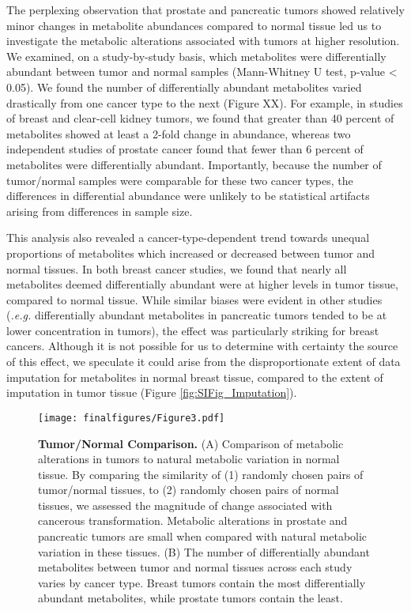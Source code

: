 \documentclass[10pt]{article}
\begin{document}
The perplexing observation that prostate and pancreatic tumors showed relatively minor changes in metabolite abundances compared to normal tissue led us to investigate the metabolic alterations associated with tumors at higher resolution. We examined, on a study-by-study basis, which metabolites were differentially abundant between tumor and normal samples (Mann-Whitney U test, p-value < 0.05). We found the number of differentially abundant metabolites varied drastically from one cancer type to the next (Figure XX). For example, in studies of breast and clear-cell kidney tumors, we found that greater than 40 percent of metabolites showed at least a 2-fold change in abundance, whereas two independent studies of prostate cancer found that fewer than 6 percent of metabolites were differentially abundant. Importantly, because the number of tumor/normal samples were comparable for these two cancer types, the differences in differential abundance were unlikely to be statistical artifacts arising from differences in sample size.

This analysis also revealed a cancer-type-dependent trend towards unequal proportions of metabolites which increased or decreased between tumor and normal tissues. In both breast cancer studies, we found that nearly all metabolites deemed differentially abundant were at higher levels in tumor tissue, compared to normal tissue. While similar biases were evident in other studies (\textit{.e.g.} differentially abundant metabolites in pancreatic tumors tended to be at lower concentration in tumors), the effect was particularly striking for breast cancers. Although it is not possible for us to determine with certainty the source of this effect, we speculate it could arise from the disproportionate extent of data imputation for metabolites in normal breast tissue, compared to the extent of imputation in tumor tissue (Figure \ref{fig:SIFig_Imputation}).

\begin{figure}[ht!]
  \centering
     \texttt{[image: finalfigures/Figure3.pdf]}
  \caption{\textbf{Tumor/Normal Comparison.} (A) Comparison of metabolic alterations in tumors to natural metabolic variation in normal tissue. By comparing the similarity of (1) randomly chosen pairs of tumor/normal tissues, to (2) randomly chosen pairs of normal tissues, we assessed the magnitude of change associated with cancerous transformation. Metabolic alterations in prostate and pancreatic tumors are small when compared with natural metabolic variation in these tissues. (B) The number of differentially abundant metabolites between tumor and normal tissues across each study varies by cancer type. Breast tumors contain the most differentially abundant metabolites, while prostate tumors contain the least. }
     \label{fig:Fig3}
\end{figure}
\end{document}
